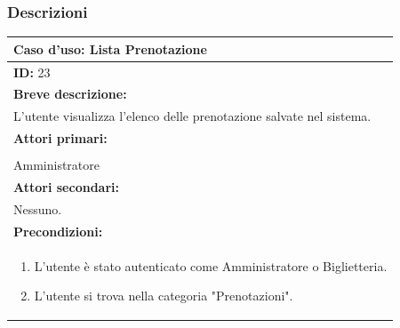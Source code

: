 \documentclass{article}
\begin{document}
            \subsubsection{Descrizioni}
                \begin{table}[H]
                    \begin{tabular}{|p{\linewidth}|}
                        \hline
                        \cellcolor{gray!100}
                        \color{white}
                        \centerline{\textbf{Caso d'uso:} Lista Prenotazione} \\
                        \hline
                        \textbf{ID:} 23 \\
                        \hline
                        \cellcolor{gray!20}
                        \textbf{Breve descrizione:} \\
                        \cellcolor{gray!20}                        
                        L'utente visualizza l'elenco delle prenotazione salvate nel sistema. \\
                        \hline
                        \textbf{Attori primari:} \\
                        \begin{minipage}{\linewidth}
                            Biglietteria \\
                            Amministratore
                        \end{minipage}
                        \vspace {-5pt} \\
                        \hline
                        \textbf{Attori secondari:} \\                        
                        Nessuno. \\
                        \hline
                        \cellcolor{gray!20}
                        \textbf{Precondizioni:} \\
                        \cellcolor{gray!20}
                        \begin{minipage}{\linewidth}
                            \begin{enumerate}
                                \item L'utente è stato autenticato come Amministratore o Biglietteria.
                                \item L'utente si trova nella categoria "Prenotazioni".
                            \end{enumerate}

\end{minipage}
\end{tabular}
\end{table}
\end{document}

